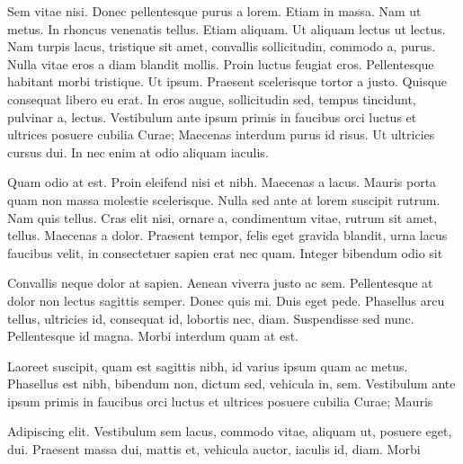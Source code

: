 \documentclass[article]{subfile}
\begin{document}
Sem vitae nisi. Donec pellentesque purus a lorem. Etiam in massa. Nam ut metus. In rhoncus venenatis tellus. Etiam aliquam. Ut aliquam lectus ut lectus. Nam turpis lacus, tristique sit amet, convallis sollicitudin, commodo a, purus. Nulla vitae eros a diam blandit mollis. Proin luctus feugiat eros. Pellentesque habitant morbi tristique. Ut ipsum. Praesent scelerisque tortor a justo. Quisque consequat libero eu erat. In eros augue, sollicitudin sed, tempus tincidunt, pulvinar a, lectus. Vestibulum ante ipsum primis in faucibus orci luctus et ultrices posuere cubilia Curae; Maecenas interdum purus id risus. Ut ultricies cursus dui. In nec enim at odio aliquam iaculis.

Quam odio at est. Proin eleifend nisi et nibh. Maecenas a lacus. Mauris porta quam non massa molestie scelerisque. Nulla sed ante at lorem suscipit rutrum. Nam quis tellus. Cras elit nisi, ornare a,
condimentum vitae, rutrum sit amet, tellus. Maecenas a dolor. Praesent tempor, felis eget gravida blandit, urna lacus faucibus velit, in consectetuer sapien erat nec quam. Integer bibendum odio sit

Convallis neque dolor at sapien. Aenean viverra justo ac sem. Pellentesque at dolor non lectus sagittis semper. Donec quis mi. Duis eget pede.
Phasellus arcu tellus, ultricies id, consequat id, lobortis nec, diam. Suspendisse sed nunc. Pellentesque id magna. Morbi interdum quam at est.

Laoreet suscipit, quam est sagittis nibh, id varius ipsum quam ac metus. Phasellus est nibh, bibendum non, dictum sed,
vehicula in, sem. Vestibulum ante ipsum primis in faucibus orci luctus et ultrices posuere cubilia Curae; Mauris

Adipiscing elit. Vestibulum sem lacus, commodo vitae, aliquam ut, posuere eget,
dui. Praesent massa dui, mattis et, vehicula auctor, iaculis id, diam. Morbi


\end{document}
